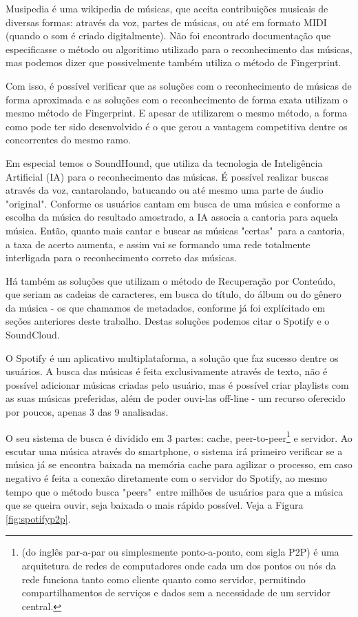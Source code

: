 Musipedia é uma wikipedia de músicas, que aceita contribuições musicais de diversas formas: através da voz, partes de músicas, ou até em formato MIDI (quando o som é criado digitalmente). Não foi encontrado documentação que especificasse o método ou algoritimo utilizado para o reconhecimento das músicas, mas podemos dizer que possivelmente também utiliza o método de Fingerprint.

Com isso, é possível verificar que as soluções com o reconhecimento de músicas de forma aproximada e as soluções com o reconhecimento de forma exata utilizam o mesmo método de Fingerprint. E apesar de utilizarem o mesmo método, a forma como pode ter sido desenvolvido é o que gerou a vantagem competitiva dentre os concorrentes do mesmo ramo.

Em especial temos o SoundHound, que utiliza da tecnologia de Inteligência Artificial (IA)  para o reconhecimento das músicas. É possível realizar buscas através da voz, cantarolando, batucando ou até mesmo uma parte de áudio "original". Conforme os usuários cantam em busca de uma música e conforme a escolha da música do resultado amostrado, a IA associa a cantoria para aquela música. Então, quanto mais cantar e buscar as músicas "certas"\ para a cantoria, a taxa de acerto aumenta, e assim vai se formando uma rede totalmente interligada para o reconhecimento correto das músicas.

Há também as soluções que utilizam o método de Recuperação por Conteúdo, que seriam as cadeias de caracteres, em busca do título, do álbum ou do gênero da música - os que chamamos de metadados, conforme já foi explícitado em seções anteriores deste trabalho. Destas soluções podemos citar o Spotify e o SoundCloud.

O Spotify é um aplicativo multiplataforma, a solução que faz sucesso dentre os usuários. A busca das músicas é feita exclusivamente através de texto, não é possível adicionar músicas criadas pelo usuário, mas é possível criar playlists com as suas músicas preferidas, além de poder ouvi-las off-line - um recurso oferecido por poucos, apenas 3 das 9 analisadas.

O seu sistema de busca é dividido em 3 partes: cache, peer-to-peer\footnote{(do inglês par-a-par ou simplesmente ponto-a-ponto, com sigla P2P) é uma arquitetura de redes de computadores onde cada um dos pontos ou nós da rede funciona tanto como cliente quanto como servidor, permitindo compartilhamentos de serviços e dados sem a necessidade de um servidor central.} e servidor. Ao escutar uma música através do smartphone, o sistema irá primeiro verificar se a música já se encontra baixada na memória cache para agilizar o processo, em caso negativo é feita a conexão diretamente com o servidor do Spotify, ao mesmo tempo que o método busca "peers"\ entre milhões de usuários para que a música que se queira ouvir, seja baixada o mais rápido possível. Veja a Figura \ref{fig:spotifyp2p}.

